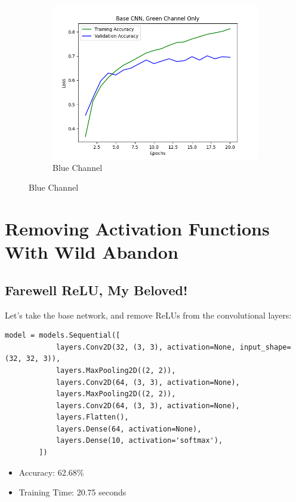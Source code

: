 \documentclass{article}
\begin{document}
\begin{figure}
\begin{subfigure}[h]{0.5\linewidth}
            \includegraphics[width=\linewidth]{Base CNN, Green Channel Only}
            \caption{Blue Channel}
        \end{subfigure}\label{fig:figure}%
    \end{figure}


    \section{Removing Activation Functions With Wild Abandon}\label{sec:wild-abandon}

    \subsection{Farewell ReLU, My Beloved!}\label{subsec:farewell-my-beloved-relu!}

    Let's take the base network, and remove ReLUs from the convolutional layers:

    \begin{lstlisting}[label={lst:no_relu}]
        model = models.Sequential([
            layers.Conv2D(32, (3, 3), activation=None, input_shape=(32, 32, 3)),
            layers.MaxPooling2D((2, 2)),
            layers.Conv2D(64, (3, 3), activation=None),
            layers.MaxPooling2D((2, 2)),
            layers.Conv2D(64, (3, 3), activation=None),
            layers.Flatten(),
            layers.Dense(64, activation=None),
            layers.Dense(10, activation='softmax'),
        ])
    \end{lstlisting}

    \begin{itemize}
        \item Accuracy: 62.68\%
        \item Training Time: 20.75 seconds
    \end{itemize}
\end{document}
